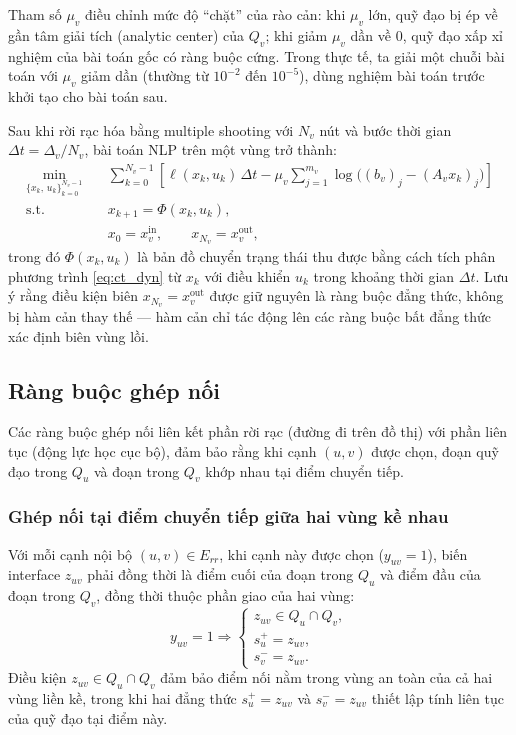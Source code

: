 Tham số $\mu_v$ điều chỉnh mức độ ``chặt'' của rào cản: khi $\mu_v$ lớn, quỹ đạo bị ép về gần tâm giải tích (analytic center) của $Q_v$; khi giảm $\mu_v$ dần về 0, quỹ đạo xấp xỉ nghiệm của bài toán gốc có ràng buộc cứng. Trong thực tế, ta giải một chuỗi bài toán với $\mu_v$ giảm dần (thường từ $10^{-2}$ đến $10^{-5}$), dùng nghiệm bài toán trước khởi tạo cho bài toán sau.

Sau khi rời rạc hóa bằng multiple shooting với $N_v$ nút và bước thời gian $\Delta t = \Delta_v/N_v$, bài toán NLP trên một vùng trở thành:
\begin{equation}
\begin{aligned}
    \min_{\{x_k,\,u_k\}_{k=0}^{N_v-1}} \quad
    & \sum_{k=0}^{N_v-1}\!\left[
        \ell(x_k,u_k)\,\Delta t
        -\mu_v\sum_{j=1}^{m_v}\log\bigl((b_v)_j-(A_v x_k)_j\bigr)
      \right] \\
    \text{s.t.} \quad
    & x_{k+1} = \Phi(x_k,u_k), \\
    & x_0 = x_v^{\mathrm{in}}, \qquad x_{N_v} = x_v^{\mathrm{out}},
\end{aligned}
\label{eq:nlp_single_region}
\end{equation}
trong đó $\Phi(x_k,u_k)$ là bản đồ chuyển trạng thái thu được bằng cách tích phân phương trình \eqref{eq:ct_dyn} từ $x_k$ với điều khiển $u_k$ trong khoảng thời gian $\Delta t$. Lưu ý rằng điều kiện biên $x_{N_v}=x_v^{\mathrm{out}}$ được giữ nguyên là ràng buộc đẳng thức, không bị hàm cản thay thế — hàm cản chỉ tác động lên các ràng buộc bất đẳng thức xác định biên vùng lồi.

\subsection{Ràng buộc ghép nối}
\label{subsec:coupling_constraints}

Các ràng buộc ghép nối liên kết phần rời rạc (đường đi trên đồ thị) với phần liên tục (động lực học cục bộ), đảm bảo rằng khi cạnh $(u,v)$ được chọn, đoạn quỹ đạo trong $Q_u$ và đoạn trong $Q_v$ khớp nhau tại điểm chuyển tiếp.

\subsubsection{Ghép nối tại điểm chuyển tiếp giữa hai vùng kề nhau}

Với mỗi cạnh nội bộ $(u,v)\in E_{rr}$, khi cạnh này được chọn ($y_{uv}=1$), biến interface $z_{uv}$ phải đồng thời là điểm cuối của đoạn trong $Q_u$ và điểm đầu của đoạn trong $Q_v$, đồng thời thuộc phần giao của hai vùng:
\begin{equation}
y_{uv}=1 \Longrightarrow
\begin{cases}
z_{uv}\in Q_u\cap Q_v,\\
s_u^+=z_{uv},\\
s_v^-=z_{uv}.
\end{cases}
\label{eq:edge_coupling_ocp}
\end{equation}
Điều kiện $z_{uv}\in Q_u\cap Q_v$ đảm bảo điểm nối nằm trong vùng an toàn của cả hai vùng liền kề, trong khi hai đẳng thức $s_u^+=z_{uv}$ và $s_v^-=z_{uv}$ thiết lập tính liên tục của quỹ đạo tại điểm này.

